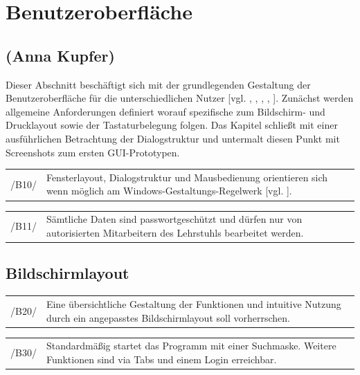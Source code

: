\section{Benutzeroberfläche}
\label{sec:Benutzeroberfläche}

\subsection*{(Anna Kupfer)}

Dieser Abschnitt beschäftigt sich mit der grundlegenden Gestaltung der Benutzeroberfläche für die unterschiedlichen Nutzer [vgl. \cite{UniRos12b}, \cite{UniRos12c}, \cite{balz1996} \cite{Balzert09}, \cite{Schae12}, \cite{Jurij07}]. Zunächst werden allgemeine Anforderungen definiert worauf spezifische zum Bildschirm- und Drucklayout sowie der Tastaturbelegung folgen. Das Kapitel schließt mit einer ausführlichen Betrachtung der Dialogstruktur und untermalt diesen Punkt mit Screenshots zum ersten GUI-Prototypen.\\


\begin{tabular}{p{1.5cm}p{14.5cm}}
 /B10/	& Fensterlayout, Dialogstruktur und Mausbedienung orientieren sich wenn möglich am Windows-Gestaltungs-Regelwerk [vgl. \cite{microsoft1995windows}]. \\[0.25cm]	 
\end{tabular}

\begin{tabular}{p{1.5cm}p{14.5cm}}
 /B11/	& Sämtliche Daten sind passwortgeschützt und dürfen nur von autorisierten Mitarbeitern des Lehrstuhls bearbeitet werden. \\[0.25cm]	 
\end{tabular}


\subsection{Bildschirmlayout}

\begin{tabular}{p{1.5cm}p{14.5cm}}
 /B20/	& Eine übersichtliche Gestaltung der Funktionen und intuitive Nutzung durch ein angepasstes Bildschirmlayout soll vorherrschen. \\[0.25cm]	 
\end{tabular}	

\begin{tabular}{p{1.5cm}p{14.5cm}}
 /B30/	& Standardmäßig startet das Programm mit einer Suchmaske. Weitere Funktionen sind via Tabs und einem Login erreichbar. \\[0.25cm]	 
\end{tabular}

